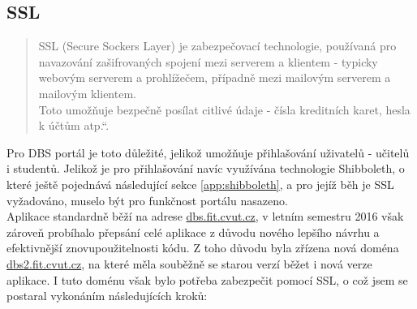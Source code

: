 \subsection{SSL}

\begin{quote}
\quotedblbase SSL (Secure Sockers Layer) je zabezpečovací technologie, používaná pro navazování zašifrovaných spojení mezi serverem a klientem - typicky webovým serverem a prohlížečem, případně mezi mailovým serverem a mailovým klientem.\\
Toto umožňuje bezpečně posílat citlivé údaje - čísla kreditních karet, hesla k účtům atp.\textquotedblleft \cite{ssl}.
\end{quote}
Pro DBS portál je toto důležité, jelikož umožňuje přihlašování uživatelů - učitelů i studentů. Jelikož je pro přihlašování navíc využívána technologie Shibboleth, o které ještě pojednává následující sekce \ref{app:shibboleth}, a pro jejíž běh je SSL vyžadováno, muselo být pro funkčnost portálu nasazeno.\\
Aplikace standardně běží na adrese \url{dbs.fit.cvut.cz}, v letním semestru 2016 však zároveň probíhalo přepsání celé aplikace z důvodu nového lepšího návrhu a efektivnější znovupoužitelnosti kódu. Z toho důvodu byla zřízena nová doména \url{dbs2.fit.cvut.cz}, na které měla souběžně se starou verzí běžet i nová verze aplikace. I tuto doménu však bylo potřeba zabezpečit pomocí SSL, o což jsem se postaral vykonáním následujících kroků:
